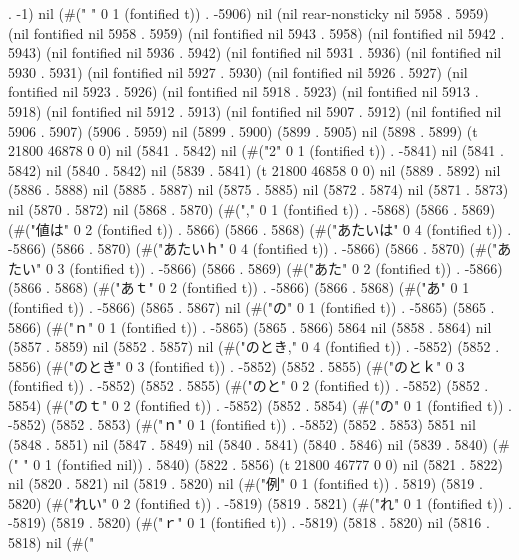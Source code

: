 . -1) nil (#(" " 0 1 (fontified t)) . -5906) nil (nil rear-nonsticky nil 5958 . 5959) (nil fontified nil 5958 . 5959) (nil fontified nil 5943 . 5958) (nil fontified nil 5942 . 5943) (nil fontified nil 5936 . 5942) (nil fontified nil 5931 . 5936) (nil fontified nil 5930 . 5931) (nil fontified nil 5927 . 5930) (nil fontified nil 5926 . 5927) (nil fontified nil 5923 . 5926) (nil fontified nil 5918 . 5923) (nil fontified nil 5913 . 5918) (nil fontified nil 5912 . 5913) (nil fontified nil 5907 . 5912) (nil fontified nil 5906 . 5907) (5906 . 5959) nil (5899 . 5900) (5899 . 5905) nil (5898 . 5899) (t 21800 46878 0 0) nil (5841 . 5842) nil (#("2" 0 1 (fontified t)) . -5841) nil (5841 . 5842) nil (5840 . 5842) nil (5839 . 5841) (t 21800 46858 0 0) nil (5889 . 5892) nil (5886 . 5888) nil (5885 . 5887) nil (5875 . 5885) nil (5872 . 5874) nil (5871 . 5873) nil (5870 . 5872) nil (5868 . 5870) (#("," 0 1 (fontified t)) . -5868) (5866 . 5869) (#("値は" 0 2 (fontified t)) . 5866) (5866 . 5868) (#("あたいは" 0 4 (fontified t)) . -5866) (5866 . 5870) (#("あたいｈ" 0 4 (fontified t)) . -5866) (5866 . 5870) (#("あたい" 0 3 (fontified t)) . -5866) (5866 . 5869) (#("あた" 0 2 (fontified t)) . -5866) (5866 . 5868) (#("あｔ" 0 2 (fontified t)) . -5866) (5866 . 5868) (#("あ" 0 1 (fontified t)) . -5866) (5865 . 5867) nil (#("の" 0 1 (fontified t)) . -5865) (5865 . 5866) (#("ｎ" 0 1 (fontified t)) . -5865) (5865 . 5866) 5864 nil (5858 . 5864) nil (5857 . 5859) nil (5852 . 5857) nil (#("のとき," 0 4 (fontified t)) . -5852) (5852 . 5856) (#("のとき" 0 3 (fontified t)) . -5852) (5852 . 5855) (#("のとｋ" 0 3 (fontified t)) . -5852) (5852 . 5855) (#("のと" 0 2 (fontified t)) . -5852) (5852 . 5854) (#("のｔ" 0 2 (fontified t)) . -5852) (5852 . 5854) (#("の" 0 1 (fontified t)) . -5852) (5852 . 5853) (#("ｎ" 0 1 (fontified t)) . -5852) (5852 . 5853) 5851 nil (5848 . 5851) nil (5847 . 5849) nil (5840 . 5841) (5840 . 5846) nil (5839 . 5840) (#(" " 0 1 (fontified nil)) . 5840) (5822 . 5856) (t 21800 46777 0 0) nil (5821 . 5822) nil (5820 . 5821) nil (5819 . 5820) nil (#("例" 0 1 (fontified t)) . 5819) (5819 . 5820) (#("れい" 0 2 (fontified t)) . -5819) (5819 . 5821) (#("れ" 0 1 (fontified t)) . -5819) (5819 . 5820) (#("ｒ" 0 1 (fontified t)) . -5819) (5818 . 5820) nil (5816 . 5818) nil (#("
